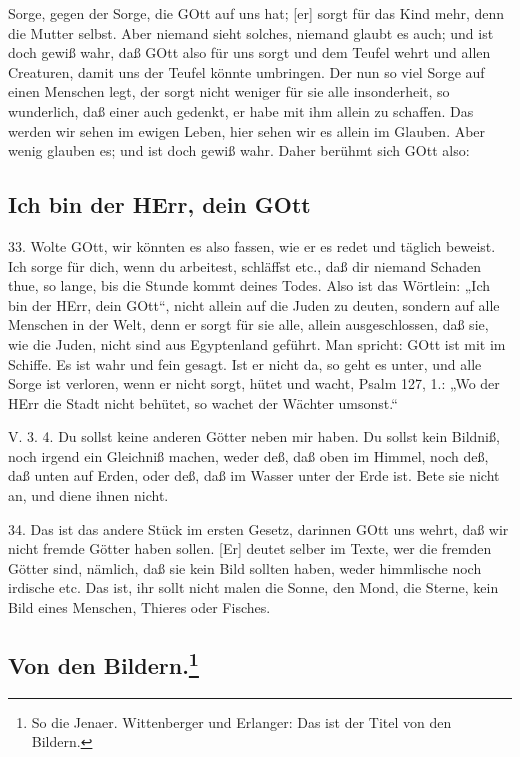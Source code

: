 Sorge, gegen der Sorge, die GOtt auf uns hat; [er] sorgt für das Kind mehr, denn die Mutter selbst. Aber niemand sieht solches, niemand glaubt es auch; und ist doch gewiß wahr, daß GOtt also für uns sorgt und dem Teufel wehrt und allen Creaturen, damit uns der Teufel könnte umbringen. Der nun so viel Sorge auf einen Menschen legt, der sorgt nicht weniger für sie alle insonderheit, so wunderlich, daß einer auch gedenkt, er habe mit ihm allein zu schaffen. Das werden wir sehen im ewigen Leben, hier sehen wir es allein im Glauben. Aber wenig glauben es; und ist doch gewiß wahr. Daher berühmt sich GOtt also:

\subsection{Ich bin der HErr, dein GOtt}

33. Wolte GOtt, wir könnten es also fassen, wie er es redet und täglich beweist. Ich sorge für dich, wenn du arbeitest, schläffst etc., daß dir niemand Schaden thue, so lange, bis die Stunde kommt deines Todes. Also ist das Wörtlein: „Ich bin der HErr, dein GOtt“, nicht allein auf die Juden zu deuten, sondern auf alle Menschen in der Welt, denn er sorgt für sie alle, allein ausgeschlossen, daß sie, wie die Juden, nicht sind aus Egyptenland geführt. Man spricht: GOtt ist mit im Schiffe. Es ist wahr und fein gesagt. Ist er nicht da, so geht es unter, und alle Sorge ist verloren, wenn er nicht sorgt, hütet und wacht, Psalm 127, 1.: „Wo der HErr die Stadt nicht behütet, so wachet der Wächter umsonst.“

\begin{schriftzitat}
V. 3. 4. Du sollst keine anderen Götter neben mir haben. Du sollst kein Bildniß, noch irgend ein Gleichniß machen, weder deß, daß oben im Himmel, noch deß, daß unten auf Erden, oder deß, daß im Wasser unter der Erde ist. Bete sie nicht an, und diene ihnen nicht.
\end{schriftzitat}

34. Das ist das andere Stück im ersten Gesetz, darinnen GOtt uns wehrt, daß wir nicht fremde Götter haben sollen. [Er] deutet selber im Texte, wer die fremden Götter sind, nämlich, daß sie kein Bild sollten haben, weder himmlische noch irdische etc. Das ist, ihr sollt nicht malen die Sonne, den Mond, die Sterne, kein Bild eines Menschen, Thieres oder Fisches.

\subsection[Von den Bildern]{Von den Bildern.\footnote{So die Jenaer. Wittenberger und Erlanger: Das ist der Titel von den Bildern.}}

